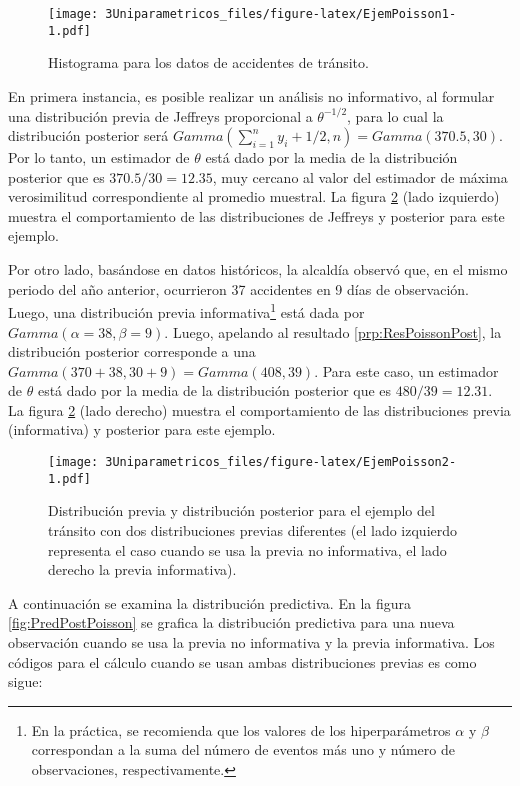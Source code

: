 \documentclass[
  10pt,
  spanish,
]{book}
\theoremstyle{definition}
\theoremstyle{definition}
\theoremstyle{definition}
\theoremstyle{definition}
\theoremstyle{remark}
\begin{document}
\begin{figure}
\centering
\texttt{[image: 3Uniparametricos\_files/figure-latex/EjemPoisson1-1.pdf]}
\caption{\label{fig:EjemPoisson1}Histograma para los datos de accidentes de tránsito.}
\end{figure}

En primera instancia, es posible realizar un análisis no informativo, al formular una distribución previa de Jeffreys proporcional a \(\theta^{-1/2}\), para lo cual la distribución posterior será \(Gamma(\sum_{i=1}^n y_i+1/2, n)=Gamma(370.5, 30)\). Por lo tanto, un estimador de \(\theta\) está dado por la media de la distribución posterior que es \(370.5/30=12.35\), muy cercano al valor del estimador de máxima verosimilitud correspondiente al promedio muestral. La figura \ref{fig:EjemPoisson2} (lado izquierdo) muestra el comportamiento de las distribuciones de Jeffreys y posterior para este ejemplo.

Por otro lado, basándose en datos históricos, la alcaldía observó que, en el mismo periodo del año anterior, ocurrieron 37 accidentes en 9 días de observación. Luego, una distribución previa informativa\footnote{En la práctica, se recomienda que los valores de los hiperparámetros \(\alpha\) y \(\beta\) correspondan a la suma del número de eventos más uno y número de observaciones, respectivamente.} está dada por \(Gamma(\alpha=38,\beta=9)\). Luego, apelando al resultado \ref{prp:ResPoissonPost}, la distribución posterior corresponde a una \(Gamma(370+38, 30+9)=Gamma(408, 39)\). Para este caso, un estimador de \(\theta\) está dado por la media de la distribución posterior que es \(480/39=12.31\). La figura \ref{fig:EjemPoisson2} (lado derecho) muestra el comportamiento de las distribuciones previa (informativa) y posterior para este ejemplo.

\begin{figure}
\centering
\texttt{[image: 3Uniparametricos\_files/figure-latex/EjemPoisson2-1.pdf]}
\caption{\label{fig:EjemPoisson2}Distribución previa y distribución posterior para el ejemplo del tránsito con dos distribuciones previas diferentes (el lado izquierdo representa el caso cuando se usa la previa no informativa, el lado derecho la previa informativa).}
\end{figure}

A continuación se examina la distribución predictiva. En la figura \ref{fig:PredPostPoisson} se grafica la distribución predictiva para una nueva observación cuando se usa la previa no informativa y la previa informativa. Los códigos para el cálculo cuando se usan ambas distribuciones previas es como sigue:
\end{document}
